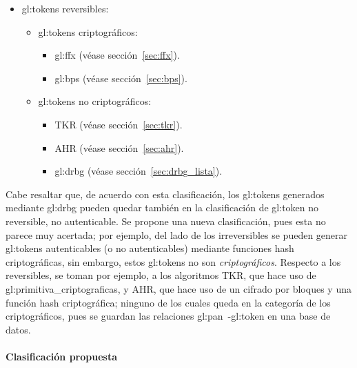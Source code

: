 \begin{itemize}
  \item \Glspl{gl:token} reversibles:
    \begin{itemize}
      \item \Glspl{gl:token} criptográficos:
        \begin{itemize}
          \item \Gls{gl:ffx} (véase sección~\ref{sec:ffx}).
          \item \Gls{gl:bps} (véase sección~\ref{sec:bps}).
        \end{itemize}
      \item \Glspl{gl:token} no criptográficos:
        \begin{itemize}
          \item TKR (véase sección~\ref{sec:tkr}).
          \item AHR (véase sección~\ref{sec:ahr}).
          \item \Gls{gl:drbg} (véase sección~\ref{sec:drbg_lista}).
        \end{itemize}
    \end{itemize}
\end{itemize}

Cabe resaltar que, de acuerdo con esta clasificación, los \glspl{gl:token}
generados mediante \gls{gl:drbg} pueden quedar también en la clasificación
de \gls{gl:token} no reversible, no autenticable. Se propone una nueva
clasificación, pues esta no parece muy acertada; por ejemplo, del lado de los
irreversibles se pueden generar \glspl{gl:token} autenticables (o no
autenticables) mediante funciones hash criptográficas, sin embargo, estos
\glspl{gl:token} no son \textit{criptográficos}. Respecto a los reversibles,
se toman por ejemplo, a los algoritmos TKR, que hace uso de
\glspl{gl:primitiva_criptografica}, y AHR, que hace uso de un cifrado
por bloques y una función hash criptográfica; ninguno de los cuales queda en
la categoría de los criptográficos, pues se guardan las relaciones
\gls{gl:pan}~-\gls{gl:token} en una base de datos.

\paragraph{Clasificación propuesta}

